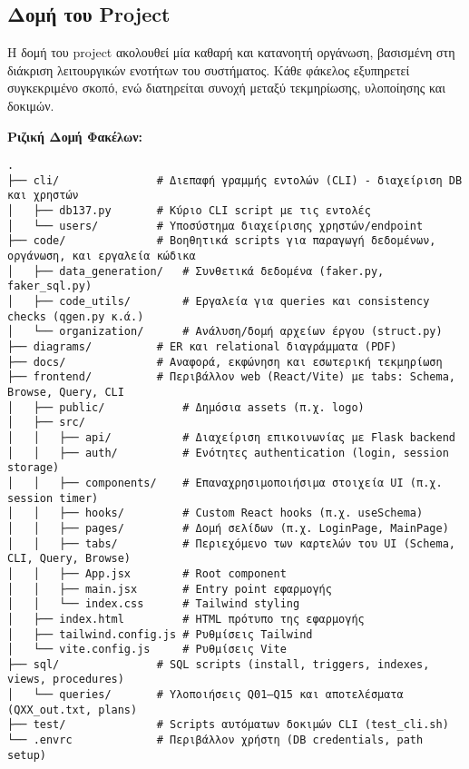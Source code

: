 \documentclass[13pt]{extarticle}
\begin{document}
\subsection{Δομή του Project}

Η δομή του project ακολουθεί μία καθαρή και κατανοητή οργάνωση, βασισμένη στη διάκριση λειτουργικών ενοτήτων του συστήματος. Κάθε φάκελος εξυπηρετεί συγκεκριμένο σκοπό, ενώ διατηρείται συνοχή μεταξύ τεκμηρίωσης, υλοποίησης και δοκιμών.

\noindent\textbf{Ριζική Δομή Φακέλων:}
\begin{verbatim}
.
├── cli/               # Διεπαφή γραμμής εντολών (CLI) - διαχείριση DB και χρηστών
│   ├── db137.py       # Κύριο CLI script με τις εντολές
│   └── users/         # Υποσύστημα διαχείρισης χρηστών/endpoint
├── code/              # Βοηθητικά scripts για παραγωγή δεδομένων, οργάνωση, και εργαλεία κώδικα
│   ├── data_generation/   # Συνθετικά δεδομένα (faker.py, faker_sql.py)
│   ├── code_utils/        # Εργαλεία για queries και consistency checks (qgen.py κ.ά.)
│   └── organization/      # Ανάλυση/δομή αρχείων έργου (struct.py)
├── diagrams/          # ER και relational διαγράμματα (PDF)
├── docs/              # Αναφορά, εκφώνηση και εσωτερική τεκμηρίωση
├── frontend/          # Περιβάλλον web (React/Vite) με tabs: Schema, Browse, Query, CLI
│   ├── public/            # Δημόσια assets (π.χ. logo)
│   ├── src/
│   │   ├── api/           # Διαχείριση επικοινωνίας με Flask backend
│   │   ├── auth/          # Ενότητες authentication (login, session storage)
│   │   ├── components/    # Επαναχρησιμοποιήσιμα στοιχεία UI (π.χ. session timer)
│   │   ├── hooks/         # Custom React hooks (π.χ. useSchema)
│   │   ├── pages/         # Δομή σελίδων (π.χ. LoginPage, MainPage)
│   │   ├── tabs/          # Περιεχόμενο των καρτελών του UI (Schema, CLI, Query, Browse)
│   │   ├── App.jsx        # Root component
│   │   ├── main.jsx       # Entry point εφαρμογής
│   │   └── index.css      # Tailwind styling
│   ├── index.html         # HTML πρότυπο της εφαρμογής
│   ├── tailwind.config.js # Ρυθμίσεις Tailwind
│   └── vite.config.js     # Ρυθμίσεις Vite
├── sql/               # SQL scripts (install, triggers, indexes, views, procedures)
│   └── queries/       # Υλοποιήσεις Q01–Q15 και αποτελέσματα (QXX_out.txt, plans)
├── test/              # Scripts αυτόματων δοκιμών CLI (test_cli.sh)
└── .envrc             # Περιβάλλον χρήστη (DB credentials, path setup)
\end{verbatim}
\end{document}
